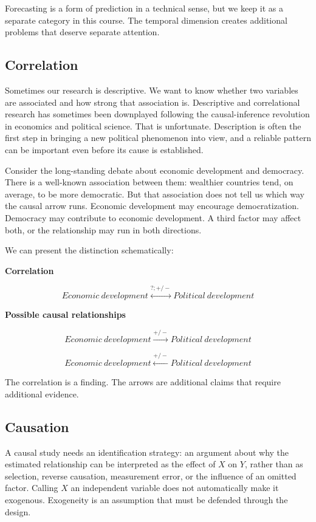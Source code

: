 \documentclass[
  a4paper,
]{scrbook}
\begin{document}
Forecasting is a form of prediction in a technical sense, but we keep it
as a separate category in this course. The temporal dimension creates
additional problems that deserve separate attention.

\subsection{Correlation}\label{correlation}

Sometimes our research is descriptive. We want to know whether two
variables are associated and how strong that association is. Descriptive
and correlational research has sometimes been downplayed following the
causal-inference revolution in economics and political science. That is
unfortunate. Description is often the first step in bringing a new
political phenomenon into view, and a reliable pattern can be important
even before its cause is established.

Consider the long-standing debate about economic development and
democracy. There is a well-known association between them: wealthier
countries tend, on average, to be more democratic. But that association
does not tell us which way the causal arrow runs. Economic development
may encourage democratization. Democracy may contribute to economic
development. A third factor may affect both, or the relationship may run
in both directions.

We can present the distinction schematically:

\textbf{Correlation}

\[Economic~development \overset{?; +/-}{\longleftrightarrow} Political~development\]

\textbf{Possible causal relationships}

\[Economic~development \overset{+/-}{\longrightarrow} Political~development\]

\[Economic~development \overset{+/-}{\longleftarrow} Political~development\]

The correlation is a finding. The arrows are additional claims that
require additional evidence.

\subsection{Causation}\label{causation}

A causal study needs an identification strategy: an argument about why
the estimated relationship can be interpreted as the effect of \(X\) on
\(Y\), rather than as selection, reverse causation, measurement error,
or the influence of an omitted factor. Calling \(X\) an independent
variable does not automatically make it exogenous. Exogeneity is an
assumption that must be defended through the design.
\end{document}
